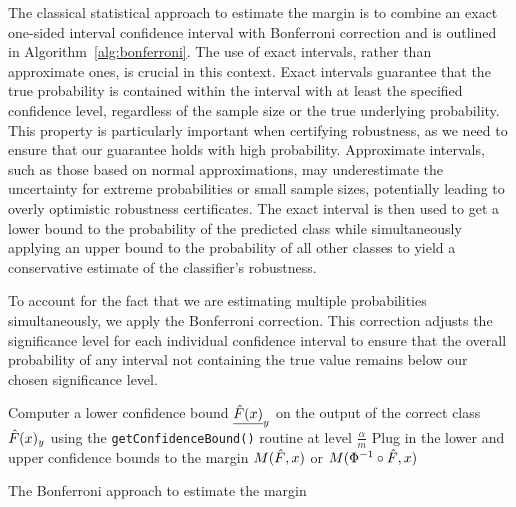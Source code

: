 The classical statistical approach to estimate the margin is to combine an exact one-sided interval confidence interval with Bonferroni correction and is outlined in Algorithm~\ref{alg:bonferroni}.
The use of exact intervals, rather than approximate ones, is crucial in this context.
Exact intervals guarantee that the true probability is contained within the interval with at least the specified confidence level, regardless of the sample size or the true underlying probability.
This property is particularly important when certifying robustness, as we need to ensure that our guarantee holds with high probability.
Approximate intervals, such as those based on normal approximations, may underestimate the uncertainty for extreme probabilities or small sample sizes, potentially leading to overly optimistic robustness certificates.
The exact interval is then used to get a lower bound to the probability of the predicted class while simultaneously applying an upper bound to the probability of all other classes to yield a conservative estimate of the classifier's robustness.

To account for the fact that we are estimating multiple probabilities simultaneously, we apply the Bonferroni correction.
This correction adjusts the significance level for each individual confidence interval to ensure that the overall probability of any interval not containing the true value remains below our chosen significance level.

\begin{algorithm}[htbp]
    \DontPrintSemicolon %

    Computer a lower confidence bound $\underline{\Hat{F}(x)}_{y}$ on the output of the correct class $\Hat{F}(x)_{y}$ using the \texttt{getConfidenceBound()} routine at level $\frac{\alpha}{m}$\;
    Plug in the lower and upper confidence bounds to the margin $M(\Hat{F},x)$ or $M(\Phi^{-1}\circ\Hat{F},x)$\;
    \caption{The Bonferroni approach to estimate the margin}\label{alg:bonferroni}
\end{algorithm}

